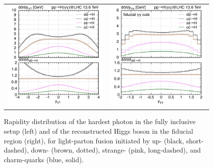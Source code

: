 \documentclass[11pt,a4paper]{article}
\begin{document}
\begin{figure}[t!]
\begin{center}
\begin{tabular}{cc}
\includegraphics[width=.45\textwidth, page=1]{plots/5fs/light/yphoton1.pdf}&
\includegraphics[width=.45\textwidth, page=1]{plots/5fs/light/y_Higgs-aafid.pdf}
\end{tabular}
\vspace*{1ex}
\caption{Rapidity distribution of the hardest photon in the fully inclusive setup (left) and of the reconstructed Higgs boson in the fiducial region (right), for light-parton fusion initiated by up- (black, short-dashed), down- (brown, dotted), strange- (pink, long-dashed), and charm-quarks (blue, solid).\label{fig:lightrapidity}}
\end{center}
\end{figure}
\end{document}

